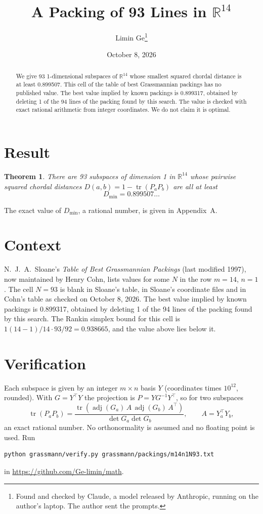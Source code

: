 \documentclass[11pt,a4paper]{article}
\title{A Packing of 93 Lines in $\mathbb{R}^{14}$}
\author{Limin Ge\thanks{Found and checked by Claude, a model released by Anthropic, running on the author's laptop. The author sent the prompts.}}
\date{October 8, 2026}
\newtheorem*{theorem}{Theorem}
\begin{document}
\maketitle
\begin{abstract}
We give 93 1-dimensional subspaces of $\mathbb{R}^{14}$ whose smallest squared chordal distance is at least 0.899507. This cell of the table of best Grassmannian packings has no published value. The best value implied by known packings is 0.899317, obtained by deleting 1 of the 94 lines of the packing found by this search. The value is checked with exact rational arithmetic from integer coordinates. We do not claim it is optimal.
\end{abstract}

\section{Result}
\begin{theorem}
There are 93 subspaces of dimension 1 in $\mathbb{R}^{14}$ whose pairwise squared chordal distances $D(a,b) = 1 - \operatorname{tr}(P_aP_b)$ are all at least
\[ D_{\min} = 0.899507\ldots \]
\end{theorem}
The exact value of $D_{\min}$, a rational number, is given in Appendix~A.


\section{Context}
N.~J.~A.~Sloane's \emph{Table of Best Grassmannian Packings} (last modified 1997), now maintained by Henry Cohn, lists values for some $N$ in the row $m=14$, $n=1$. The cell $N=93$ is blank in Sloane's table, in Sloane's coordinate files and in Cohn's table as checked on October 8, 2026. The best value implied by known packings is 0.899317, obtained by deleting 1 of the 94 lines of the packing found by this search. The Rankin simplex bound for this cell is $1(14-1)/14\cdot 93/92 = 0.938665$, and the value above lies below it.


\section{Verification}
Each subspace is given by an integer $m\times n$ basis $Y$ (coordinates times $10^{12}$, rounded). With $G=Y^\top Y$ the projection is $P=YG^{-1}Y^\top$, so for two subspaces
\[ \operatorname{tr}(P_aP_b)=\frac{\operatorname{tr}(\operatorname{adj}(G_a)\,A\,\operatorname{adj}(G_b)\,A^\top)}{\det G_a\det G_b},\qquad A=Y_a^\top Y_b, \]
an exact rational number. No orthonormality is assumed and no floating point is used. Run
\begin{verbatim}
python grassmann/verify.py grassmann/packings/m14n1N93.txt
\end{verbatim}
in \url{https://github.com/Ge-limin/math}.
\end{document}
